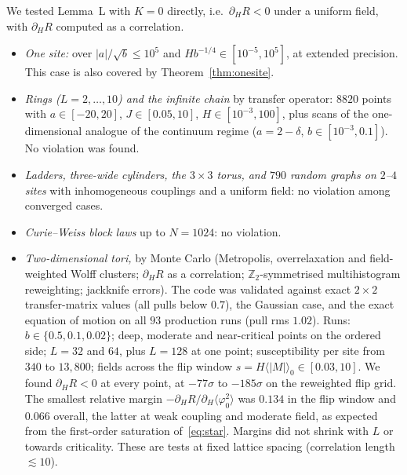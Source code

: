 We tested Lemma~L with $K=0$ directly, i.e.\ $\partial_HR<0$ under a uniform field, with $\partial_HR$ computed as a correlation.
\begin{itemize}
\item \emph{One site:} over $|a|/\sqrt b\le10^5$ and $Hb^{-1/4}\in[10^{-5},10^5]$, at extended precision. This case is also covered by Theorem~\ref{thm:onesite}.
\item \emph{Rings ($L=2,\dots,10$) and the infinite chain} by transfer operator: $8820$ points with $a\in[-20,20]$, $J\in[0.05,10]$, $H\in[10^{-3},100]$, plus scans of the one-dimensional analogue of the continuum regime ($a=2-\delta$, $b\in[10^{-3},0.1]$). No violation was found.
\item \emph{Ladders, three-wide cylinders, the $3\times3$ torus, and $790$ random graphs on $2$--$4$ sites} with inhomogeneous couplings and a uniform field: no violation among converged cases.
\item \emph{Curie--Weiss block laws} up to $N=1024$: no violation.
\item \emph{Two-dimensional tori,} by Monte Carlo (Metropolis, overrelaxation and field-weighted Wolff clusters; $\partial_HR$ as a correlation; $\mathbb Z_2$-symmetrised multihistogram reweighting; jackknife errors). The code was validated against exact $2\times2$ transfer-matrix values (all pulls below $0.7$), the Gaussian case, and the exact equation of motion on all $93$ production runs (pull rms $1.02$). Runs: $b\in\{0.5,0.1,0.02\}$; deep, moderate and near-critical points on the ordered side; $L=32$ and $64$, plus $L=128$ at one point; susceptibility per site from $340$ to $13{,}800$; fields across the flip window $s=H\langle|M|\rangle_0\in[0.03,10]$. We found $\partial_HR<0$ at every point, at $-77\sigma$ to $-185\sigma$ on the reweighted flip grid. The smallest relative margin $-\partial_HR/\partial_H\langle\varphi_0^2\rangle$ was $0.134$ in the flip window and $0.066$ overall, the latter at weak coupling and moderate field, as expected from the first-order saturation of~\eqref{eq:star}. Margins did not shrink with $L$ or towards criticality. These are tests at fixed lattice spacing (correlation length $\lesssim10$).

\end{itemize}
